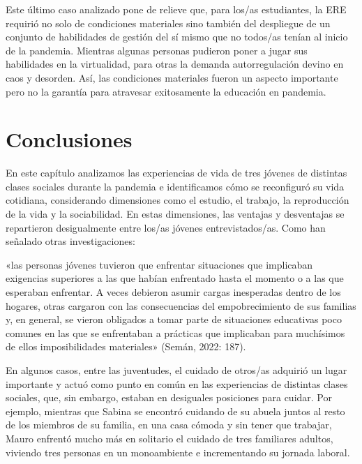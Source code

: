\begin{refsection}
\begin{gbcita}
\end{gbcita}

Este último caso analizado pone de relieve que, para los/as estudiantes, la ERE requirió no solo de condiciones materiales sino también del despliegue de un conjunto de habilidades de gestión del sí mismo que no todos/as tenían al inicio de la pandemia. Mientras algunas personas pudieron poner a jugar sus habilidades en la virtualidad, para otras la demanda autorregulación devino en caos y desorden. Así, las condiciones materiales fueron un aspecto importante pero no la garantía para atravesar exitosamente la educación en pandemia.


\section[Conclusiones]{Conclusiones}
\label{cap-27.conclusiones}
En este capítulo analizamos las experiencias de vida de tres jóvenes de distintas clases sociales durante la pandemia e identificamos cómo se reconfiguró su vida cotidiana, considerando dimensiones como el estudio, el trabajo, la reproducción de la vida y la sociabilidad. En estas dimensiones, las ventajas y desventajas se repartieron desigualmente entre los/as jóvenes entrevistados/as. Como han señalado otras investigaciones:


\begin{gbcita}
«las personas jóvenes tuvieron que enfrentar situaciones que implicaban exigencias superiores a las que habían enfrentado hasta el momento o a las que esperaban enfrentar. A veces debieron asumir cargas inesperadas dentro de los hogares, otras cargaron con las consecuencias del empobrecimiento de sus familias y, en general, se vieron obligados a tomar parte de situaciones educativas poco comunes en las que se enfrentaban a prácticas que implicaban para muchísimos de ellos imposibilidades materiales» (Semán, 2022: 187).

\end{gbcita}

En algunos casos, entre las juventudes, el cuidado de otros/as adquirió un lugar importante y actuó como punto en común en las experiencias de distintas clases sociales, que, sin embargo, estaban en desiguales posiciones para cuidar. Por ejemplo, mientras que Sabina se encontró cuidando de su abuela juntos al resto de los miembros de su familia, en una casa cómoda y sin tener que trabajar, Mauro enfrentó mucho más en solitario el cuidado de tres familiares adultos, viviendo tres personas en un monoambiente e incrementando su jornada laboral.


\end{refsection}
